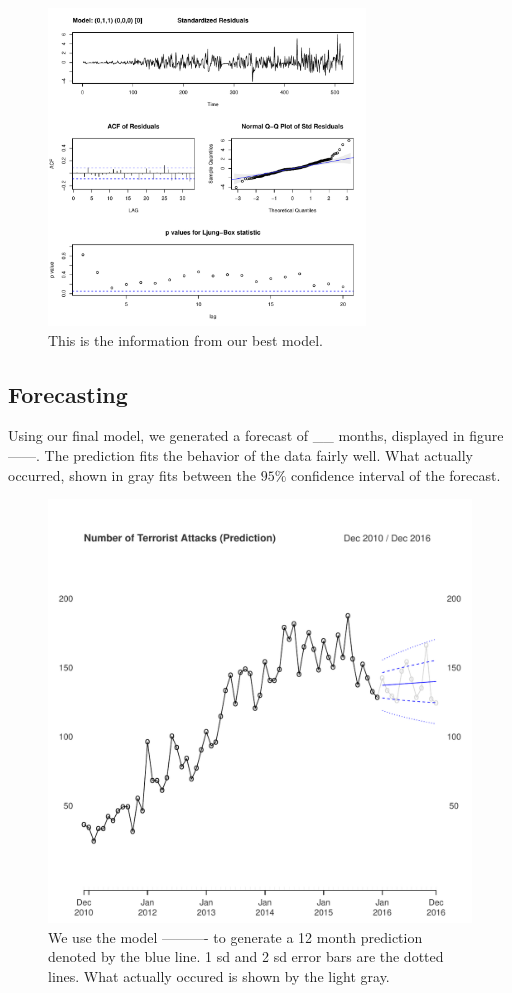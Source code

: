 \documentclass[11pt]{paper}
\begin{document}
\begin{figure}
\centering
    \includegraphics[width=0.75\textwidth]{../image/best_model.pdf}
\caption{This is the information from our best model.}
\label{best_mode}
\end{figure}

\subsection{Forecasting}

Using our final model, we generated a forecast of __ months, displayed in figure ------. The prediction fits the behavior of the data fairly well. What actually occurred, shown in gray fits between the $95\%$ confidence interval of the forecast.


\begin{figure}
\centering
\includegraphics[width=0.75\linewidth]{../image/prediction_on_testing.pdf}
\caption{We use the model ---------- to generate a 12 month prediction denoted by the blue line. 1 sd and 2 sd error bars are the dotted lines. What actually occured is shown by the light gray.}
\label{prediction}
\end{figure}
\end{document}
